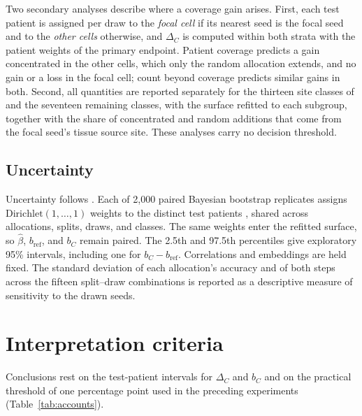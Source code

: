 \documentclass[11pt]{article}
\begin{document}
Two secondary analyses describe where a coverage gain arises. First, each test patient is assigned per draw to the \emph{focal cell} if its nearest seed is the focal seed and to the \emph{other cells} otherwise, and $\Delta_C$ is computed within both strata with the patient weights of the primary endpoint. Patient coverage predicts a gain concentrated in the other cells, which only the random allocation extends, and no gain or a loss in the focal cell; count beyond coverage predicts similar gains in both. Second, all quantities are reported separately for the thirteen site classes of \citet{queisler2026siteCoverage} and the seventeen remaining classes, with the surface refitted to each subgroup, together with the share of concentrated and random additions that come from the focal seed's tissue source site. These analyses carry no decision threshold.

\subsection{Uncertainty}
\label{sec:uncertainty}
Uncertainty follows \citet{queisler2026effectiveSupport}. Each of 2,000 paired Bayesian bootstrap replicates assigns $\mathrm{Dirichlet}(1,\ldots,1)$ weights to the distinct test patients \citep{rubin1981bayesian}, shared across allocations, splits, draws, and classes. The same weights enter the refitted surface, so $\hat\beta$, $b_{\mathrm{ref}}$, and $b_C$ remain paired. The 2.5th and 97.5th percentiles give exploratory 95\% intervals, including one for $b_C-b_{\mathrm{ref}}$. Correlations and embeddings are held fixed. The standard deviation of each allocation's accuracy and of both steps across the fifteen split--draw combinations is reported as a descriptive measure of sensitivity to the drawn seeds.

\section{Interpretation criteria}
\label{sec:interpretation}
Conclusions rest on the test-patient intervals for $\Delta_C$ and $b_C$ and on the practical threshold of one percentage point used in the preceding experiments (Table~\ref{tab:accounts}).
\end{document}
